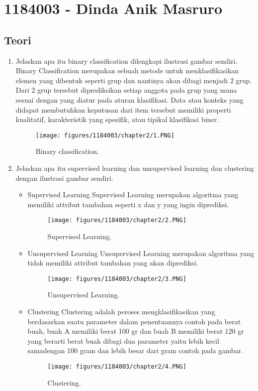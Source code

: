\section{1184003 - Dinda Anik Masruro}
\subsection{Teori}
\begin{enumerate}

	\item Jelaskan apa itu binary classification dilengkapi ilustrasi gambar sendiri.
	\hfill\break
    Binary Classification merupakan sebuah metode untuk menklasifikasikan elemen yang dibentuk seperti grup dan nantinya akan  dibagi menjadi 2 grup. Dari 2 grup tersebut diprediksikan setiap anggota pada grup yang mana sesuai dengan yang diatur pada aturan klasifikasi. Data atau konteks yang didapat membutuhkan keputusan dari item tersebut memiliki properti kualitatif, karakteristik yang spesifik, atau tipikal klasifikasi biner.

	\begin{figure}[h]
	\centering
		\texttt{[image: figures/1184003/chapter2/1.PNG]}
		\caption{Binary classification.}
	\end{figure}

	\item Jelaskan apa itu supervised learning dan unsupervised learning dan clustering dengan ilustrasi gambar sendiri.
	\hfill\break

	\begin{itemize}
		\item Supervised Learning
		\hfill\break Supervised Learning	merupakan algoritma yang memiliki attribut tambahan seperti x dan y yang ingin diprediksi.
		
		\begin{figure}[h]
		\centering
			\texttt{[image: figures/1184003/chapter2/2.PNG]}
			\caption{Supervised Learning.}
		\end{figure}
		\newpage\item Unsupervised Learning 
		\hfill\break
		Unsupervised Learning  merupakan	algoritma yang tidak memiliki attribut tambahan yang akan diprediksi.
		\begin{figure}[h]
		\centering
			\texttt{[image: figures/1184003/chapter2/3.PNG]}
			\caption{Unsupervised Learning.}
		\end{figure}

		\item Clustering
		\hfill\break
		Clustering adalah peroses mengklasifikasikan yang berdasarkan suatu parameter dalam penentuannya contoh pada berat buah, buah A memiliki berat 100 gr dan buah B memiliki berat 120 gr yang berarti berat buah dibagi dua parameter yaitu lebih kecil samadengan 100 gram dan lebih besar dari gram contoh pada gambar.
		\begin{figure}[h]
		\centering
			\texttt{[image: figures/1184003/chapter2/4.PNG]}
			\caption{Clustering.}
		\end{figure}
	\end{itemize}
	

\end{enumerate}
